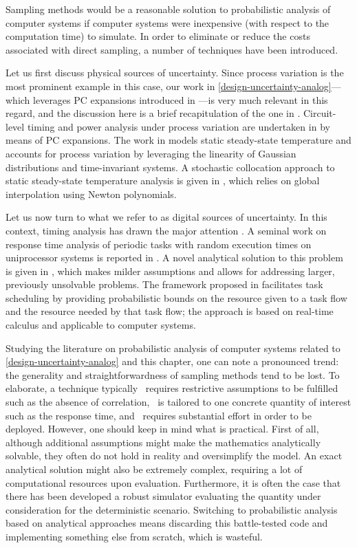 Sampling methods would be a reasonable solution to probabilistic analysis of
computer systems if computer systems were inexpensive (with respect to the
computation time) to simulate. In order to eliminate or reduce the costs
associated with direct sampling, a number of techniques have been introduced.

Let us first discuss physical sources of uncertainty. Since process variation is
the most prominent example in this case, our work in
\cref{design-uncertainty-analog}---which leverages \ac{PC} expansions
\cite{xiu2010} introduced in ---is very much relevant in
this regard, and the discussion here is a brief recapitulation of the one in
. Circuit-level timing and power analysis under process
variation are undertaken in \cite{bhardwaj2008} by means of \ac{PC} expansions.
The work in \cite{juan2012} models static steady-state temperature and accounts
for process variation by leveraging the linearity of Gaussian distributions and
time-invariant systems. A stochastic collocation \cite{xiu2010} approach to
static steady-state temperature analysis is given in \cite{lee2013}, which
relies on global interpolation using Newton polynomials.

Let us now turn to what we refer to as digital sources of uncertainty. In this
context, timing analysis has drawn the major attention \cite{quinton2012}. A
seminal work on response time analysis of periodic tasks with random execution
times on uniprocessor systems is reported in \cite{diaz2002}. A novel analytical
solution to this problem is given in \cite{tanasa2015}, which makes milder
assumptions and allows for addressing larger, previously unsolvable problems.
The framework proposed in \cite{santinelli2011} facilitates task scheduling by
providing probabilistic bounds on the resource given to a task flow and the
resource needed by that task flow; the approach is based on real-time calculus
and applicable to computer systems.

Studying the literature on probabilistic analysis of computer systems related to
\cref{design-uncertainty-analog} and this chapter, one can note a pronounced
trend: the generality and straightforwardness of sampling methods tend to be
lost. To elaborate, a technique typically \one~requires restrictive assumptions
to be fulfilled such as the absence of correlation, \two~is tailored to one
concrete quantity of interest such as the response time, and \three~requires
substantial effort in order to be deployed. However, one should keep in mind
what is practical. First of all, although additional assumptions might make the
mathematics analytically solvable, they often do not hold in reality and
oversimplify the model. An exact analytical solution might also be extremely
complex, requiring a lot of computational resources upon evaluation.
Furthermore, it is often the case that there has been developed a robust
simulator evaluating the quantity under consideration for the deterministic
scenario. Switching to probabilistic analysis based on analytical approaches
means discarding this battle-tested code and implementing something else from
scratch, which is wasteful.


